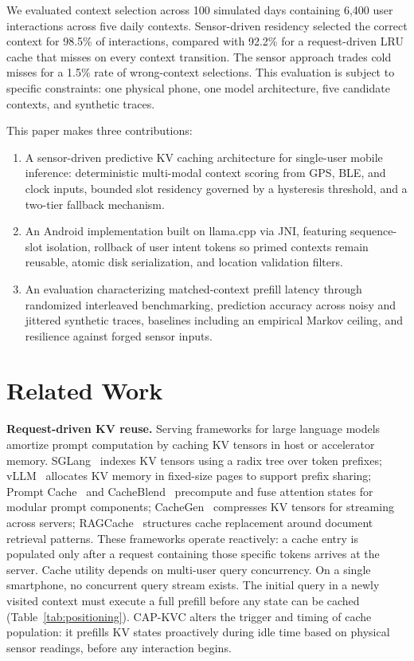\documentclass[conference]{IEEEtran}
\begin{document}
We evaluated context selection across 100 simulated days containing 6,400 user interactions across five daily contexts. Sensor-driven residency selected the correct context for 98.5\% of interactions, compared with 92.2\% for a request-driven LRU cache that misses on every context transition. The sensor approach trades cold misses for a 1.5\% rate of wrong-context selections. This evaluation is subject to specific constraints: one physical phone, one model architecture, five candidate contexts, and synthetic traces.

This paper makes three contributions:
\begin{enumerate}
\item A sensor-driven predictive KV caching architecture for single-user mobile inference: deterministic multi-modal context scoring from GPS, BLE, and clock inputs, bounded slot residency governed by a hysteresis threshold, and a two-tier fallback mechanism.
\item An Android implementation built on llama.cpp via JNI, featuring sequence-slot isolation, rollback of user intent tokens so primed contexts remain reusable, atomic disk serialization, and location validation filters.
\item An evaluation characterizing matched-context prefill latency through randomized interleaved benchmarking, prediction accuracy across noisy and jittered synthetic traces, baselines including an empirical Markov ceiling, and resilience against forged sensor inputs.
\end{enumerate}

\section{Related Work}
\label{sec:related}

\textbf{Request-driven KV reuse.}
Serving frameworks for large language models amortize prompt computation by caching KV tensors in host or accelerator memory. SGLang~\cite{sglang} indexes KV tensors using a radix tree over token prefixes; vLLM~\cite{vllm} allocates KV memory in fixed-size pages to support prefix sharing; Prompt Cache~\cite{promptcache} and CacheBlend~\cite{cacheblend} precompute and fuse attention states for modular prompt components; CacheGen~\cite{cachegen} compresses KV tensors for streaming across servers; RAGCache~\cite{ragcache} structures cache replacement around document retrieval patterns. These frameworks operate reactively: a cache entry is populated only after a request containing those specific tokens arrives at the server. Cache utility depends on multi-user query concurrency. On a single smartphone, no concurrent query stream exists. The initial query in a newly visited context must execute a full prefill before any state can be cached (Table~\ref{tab:positioning}). CAP-KVC alters the trigger and timing of cache population: it prefills KV states proactively during idle time based on physical sensor readings, before any interaction begins.
\end{document}
